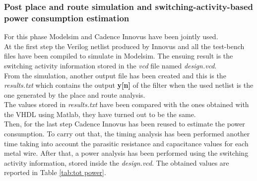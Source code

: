 \documentclass[a4paper, titlepage]{article}
\begin{document}
\subsubsection{Post place and route simulation and switching-activity-based power consumption estimation}
For this phase Modelsim and Cadence Innovus have been jointly used.\\At the first step the Verilog netlist produced by Innovus and all the test-bench files have been compiled to simulate in Modelsim. The ensuing result %
is the switching activity information stored in the \textit{vcd} file named \textit{design.vcd}.\\From the simulation, another output file has been created and this is the \textit{results.txt} which contains the output \textbf{y[n]} of the filter when the used netlist is the one generated by the place and route analysis.\\The values stored in \textit{results.txt}  have been compared with the ones obtained with the VHDL using Matlab, they have turned out to be the same. 
\\Then, for the last step Cadence Innovus has been reused to estimate the power consumption. To carry out that, the timing analysis has been performed another time taking into account the parasitic resistance and capacitance values for each metal wire. After that, a power analysis has been performed using the switching activity information, stored inside the \textit{design.vcd}. The obtained values are reported in Table \ref{tab:tot power}.
\end{document}
